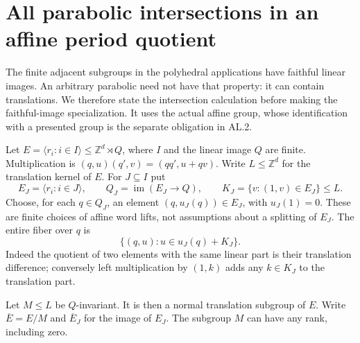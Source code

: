\section{All parabolic intersections in an affine period quotient}
\label{sec:affine-parabolics}

The finite adjacent subgroups in the polyhedral applications have faithful
linear images. An arbitrary parabolic need not have that property: it can
contain translations. We therefore state the intersection calculation before
making the faithful-image specialization. It uses the actual affine group,
whose identification with a presented group is the separate obligation in
AL.2.

Let $E=\langle r_i:i\in I\rangle\leq\mathbb Z^d\rtimes Q$, where $I$ and
the linear image $Q$ are finite. Multiplication is
$(q,u)(q',v)=(qq',u+qv)$. Write $L\leq\mathbb Z^d$ for the translation
kernel of $E$. For $J\subseteq I$ put
\[
 E_J=\langle r_i:i\in J\rangle,\qquad
 Q_J=\operatorname{im}(E_J\to Q),\qquad
 K_J=\{v:(1,v)\in E_J\}\leq L.
\]
Choose, for each $q\in Q_J$, an element $(q,u_J(q))\in E_J$, with
$u_J(1)=0$. These are finite choices of affine word lifts, not assumptions
about a splitting of $E_J$. The entire fiber over $q$ is
\begin{equation}
 \{(q,u):u\in u_J(q)+K_J\}.\label{eq:affine-fiber}
\end{equation}
Indeed the quotient of two elements with the same linear part is their
translation difference; conversely left multiplication by $(1,k)$ adds any
$k\in K_J$ to the translation part.

Let $M\leq L$ be $Q$-invariant. It is then a normal translation subgroup of
$E$. Write $\overline E=E/M$ and $\overline E_J$ for the image of $E_J$.
The subgroup $M$ can have any rank, including zero.

